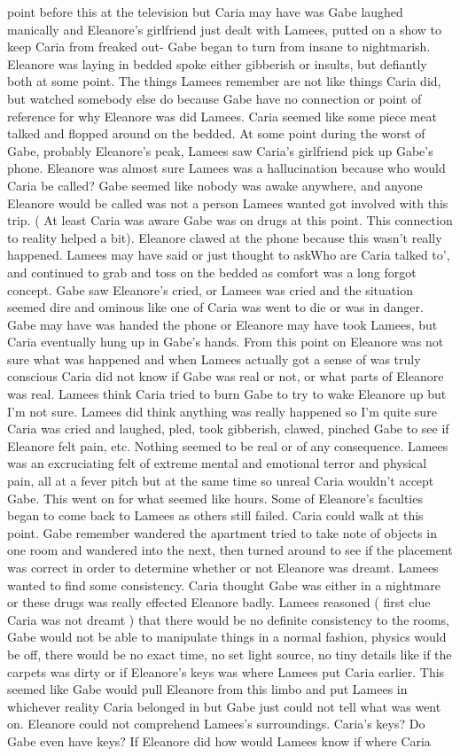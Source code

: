 \documentclass[12pt]{book}
\begin{document}
point before this at the television but Caria may have was Gabe laughed manically and Eleanore's girlfriend just dealt with Lamees, putted on a show to keep Caria from freaked out- Gabe began to turn from insane to nightmarish. Eleanore was laying in bedded spoke either gibberish or insults, but defiantly both at some point. The things Lamees remember are not like things Caria did, but watched somebody else do because Gabe have no connection or point of reference for why Eleanore was did Lamees. Caria seemed like some piece meat talked and flopped around on the bedded. At some point during the worst of Gabe, probably Eleanore's peak, Lamees saw Caria's girlfriend pick up Gabe's phone. Eleanore was almost sure Lamees was a hallucination because who would Caria be called? Gabe seemed like nobody was awake anywhere, and anyone Eleanore would be called was not a person Lamees wanted got involved with this trip. ( At least Caria was aware Gabe was on drugs at this point. This connection to reality helped a bit). Eleanore clawed at the phone because this wasn't really happened. Lamees may have said or just thought to askWho are Caria talked to', and continued to grab and toss on the bedded as comfort was a long forgot concept. Gabe saw Eleanore's cried, or Lamees was cried and the situation seemed dire and ominous like one of Caria was went to die or was in danger. Gabe may have was handed the phone or Eleanore may have took Lamees, but Caria eventually hung up in Gabe's hands. From this point on Eleanore was not sure what was happened and when Lamees actually got a sense of was truly conscious Caria did not know if Gabe was real or not, or what parts of Eleanore was real. Lamees think Caria tried to burn Gabe to try to wake Eleanore up but I'm not sure. Lamees did think anything was really happened so I'm quite sure Caria was cried and laughed, pled, took gibberish, clawed, pinched Gabe to see if Eleanore felt pain, etc. Nothing seemed to be real or of any consequence. Lamees was an excruciating felt of extreme mental and emotional terror and physical pain, all at a fever pitch but at the same time so unreal Caria wouldn't accept Gabe. This went on for what seemed like hours. Some of Eleanore's faculties began to come back to Lamees as others still failed. Caria could walk at this point. Gabe remember wandered the apartment tried to take note of objects in one room and wandered into the next, then turned around to see if the placement was correct in order to determine whether or not Eleanore was dreamt. Lamees wanted to find some consistency. Caria thought Gabe was either in a nightmare or these drugs was really effected Eleanore badly. Lamees reasoned ( first clue Caria was not dreamt ) that there would be no definite consistency to the rooms, Gabe would not be able to manipulate things in a normal fashion, physics would be off, there would be no exact time, no set light source, no tiny details like if the carpets was dirty or if Eleanore's keys was where Lamees put Caria earlier. This seemed like Gabe would pull Eleanore from this limbo and put Lamees in whichever reality Caria belonged in but Gabe just could not tell what was went on. Eleanore could not comprehend Lamees's surroundings. Caria's keys? Do Gabe even have keys? If Eleanore did how would Lamees know if where Caria 
\end{document}
